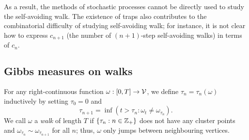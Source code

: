 \begin{example}
As a result, the methods of stochastic processes cannot be directly used to
study the self-avoiding walk. The existence of traps also contributes to the
combinatorial difficulty of studying self-avoiding walk; for instance, it is
not clear how to express $c_{n+1}$ (the number of $(n+1)$-step self-avoiding walks)
in terms of $c_n$.

\end{example}


\subsection{Gibbs measures on walks}

For any right-continuous function $\omega : [0, T] \rightarrow \mathcal{V}$, we define
$\tau_n = \tau_n(\omega)$ inductively by setting $\tau_0 = 0$ and
\begin{equation}
\tau_{n+1} = \inf(t > \tau_n : \omega_t \ne \omega_{\tau_n}).
\end{equation}
We call $\omega$ a \emph{walk} of length $T$ if
$\{ \tau_n : n \in {\mathbb Z}_+ \}$ does not have any cluster points and
$\omega_{\tau_n} \sim \omega_{\tau_{n+1}}$ for all $n$; thus, $\omega$
only jumps between neighbouring vertices.

